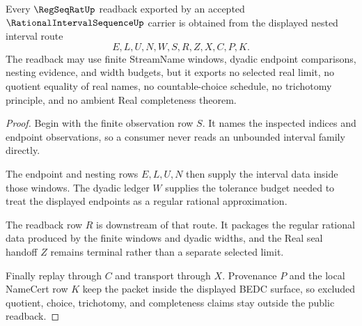 \begin{theorem}
\label{thm:rational-interval-sequence-regseqrat-readback}
Every $\RegSeqRatUp$ readback exported by an accepted $\RationalIntervalSequenceUp$ carrier is obtained from the displayed nested interval route
$$
E,L,U,N,W,S,R,Z,X,C,P,K.
$$
The readback may use finite StreamName windows, dyadic endpoint comparisons, nesting evidence, and width budgets, but it exports no selected real limit, no quotient equality of real names, no countable-choice schedule, no trichotomy principle, and no ambient Real completeness theorem.
\end{theorem}
\begin{proof}
Begin with the finite observation row $S$. It names the inspected indices and endpoint observations, so a consumer never reads an unbounded interval family directly.

The endpoint and nesting rows $E,L,U,N$ then supply the interval data inside those windows. The dyadic ledger $W$ supplies the tolerance budget needed to treat the displayed endpoints as a regular rational approximation.

The readback row $R$ is downstream of that route. It packages the regular rational data produced by the finite windows and dyadic widths, and the Real seal handoff $Z$ remains terminal rather than a separate selected limit.

Finally replay through $C$ and transport through $X$. Provenance $P$ and the local NameCert row $K$ keep the packet inside the displayed BEDC surface, so excluded quotient, choice, trichotomy, and completeness claims stay outside the public readback.
\end{proof}




